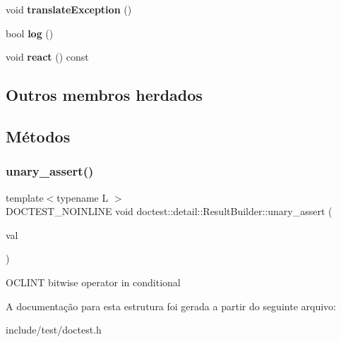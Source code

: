 \begin{DoxyCompactItemize}
\item 
\mbox{\label{structdoctest_1_1detail_1_1ResultBuilder_a5eece6aa3b1a2cb366cf5a0cc6c854a3}} 
void {\bfseries translate\+Exception} ()
\item 
\mbox{\label{structdoctest_1_1detail_1_1ResultBuilder_a2af75dd1d8db8d3aa949d78025854085}} 
bool {\bfseries log} ()
\item 
\mbox{\label{structdoctest_1_1detail_1_1ResultBuilder_a03686f862471728c2980d72e02980213}} 
void {\bfseries react} () const
\end{DoxyCompactItemize}
\subsection*{Outros membros herdados}


\subsection{Métodos}
\mbox{\label{structdoctest_1_1detail_1_1ResultBuilder_a98c33e90242e2859255a79cb38489f3b}} 
\subsubsection{\texorpdfstring{unary\+\_\+assert()}{unary\_assert()}}
{\footnotesize\ttfamily template$<$typename L $>$ \\
D\+O\+C\+T\+E\+S\+T\+\_\+\+N\+O\+I\+N\+L\+I\+NE void doctest\+::detail\+::\+Result\+Builder\+::unary\+\_\+assert (\begin{DoxyParamCaption}\item[{const D\+O\+C\+T\+E\+S\+T\+\_\+\+R\+E\+F\+\_\+\+W\+R\+AP(L)}]{val }\end{DoxyParamCaption})\hspace{0.3cm}{\ttfamily [inline]}}

O\+C\+L\+I\+NT bitwise operator in conditional 

A documentação para esta estrutura foi gerada a partir do seguinte arquivo\+:\begin{DoxyCompactItemize}
\item 
include/test/doctest.\+h\end{DoxyCompactItemize}
